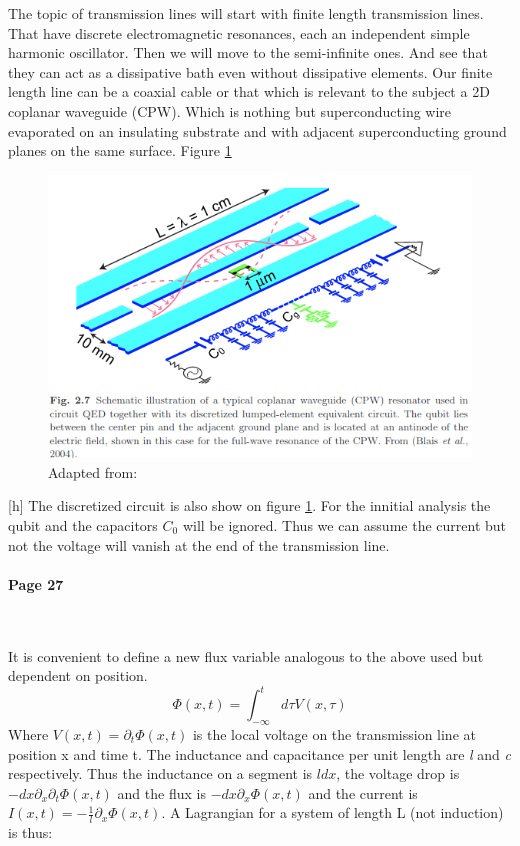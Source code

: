 \documentclass[12pt]{article}
\numberwithin{equation}{subsection}
\newcommand\page[1]{
{
\color{blue}\paragraph{
Page #1
}\mbox{}\\
}
}
\begin{document}
The topic of transmission lines will start with finite length transmission lines. That have discrete electromagnetic resonances, each an independent simple harmonic oscillator.
Then we will move to the semi-infinite ones. And see that they can act as a dissipative bath even without dissipative elements.
Our finite length line can be a coaxial cable or that which is relevant to the subject a 2D coplanar waveguide (CPW). Which is nothing but superconducting wire evaporated on an insulating substrate and with adjacent superconducting ground planes on the same surface. Figure \ref{fig:cpw}

\begin{figure}[h]
\includegraphics[scale=0.8]{images/26-cpw.png}
\caption{Adapted from: \cite{Girvin2015CircuitQS}}
\label{fig:cpw}
\end{figure}[h]
The discretized circuit is also show on figure \ref{fig:cpw}. For the innitial analysis the qubit and the capacitors $C_0$ will be ignored. Thus we can assume the current but not the voltage will vanish at the end of the transmission line.

\page{27}
It is convenient to define a new flux variable analogous to the above used but dependent on position. 
\begin{equation}
    \Phi(x,t) = \int^t_{-\infty} d\tau V(x,\tau)
\end{equation}
Where $V(x,t)= \partial_t\Phi(x,t)$ is the local voltage on the transmission line at position x and time t. The inductance and capacitance per unit length are \emph l and \emph c respectively.
Thus the inductance on a segment is $ l dx$, the voltage drop is $-dx \partial_x\partial_t\Phi(x,t)$ and the flux is $ -dx \partial _x \Phi(x,t)$ and the current is $I(x,t) = - \frac{1}{l} \partial_x \Phi(x,t)$.
A Lagrangian for a system of length L (not induction) is thus:
\end{document}
